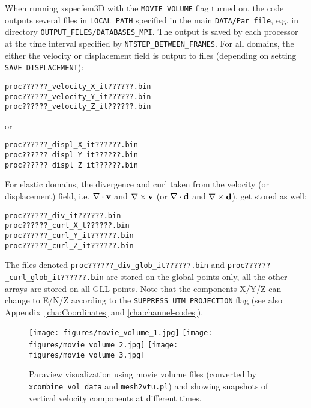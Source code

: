When running xspecfem3D with the
\texttt{\small MOVIE\_VOLUME}
flag turned on, the code outputs several files in \texttt{\small LOCAL\_PATH}
specified in the main \texttt{DATA/Par\_file},
e.g. in directory \texttt{\small OUTPUT\_FILES/DATABASES\_MPI}.
The output is saved by each processor at the time interval specified
by
\texttt{\small NTSTEP\_BETWEEN\_FRAMES}.
For all domains,
the either the velocity or displacement field is output to files (depending on setting \texttt{SAVE\_DISPLACEMENT}):
{\small
\begin{verbatim}
proc??????_velocity_X_it??????.bin
proc??????_velocity_Y_it??????.bin
proc??????_velocity_Z_it??????.bin
\end{verbatim}
}
\noindent
or
{\small
\begin{verbatim}
proc??????_displ_X_it??????.bin
proc??????_displ_Y_it??????.bin
proc??????_displ_Z_it??????.bin
\end{verbatim}
}
\noindent
For elastic domains, the divergence and curl taken from the velocity (or displacement) field,
i.e. $\nabla\cdot{\bf {v}}$ and $\nabla\times{\bf {v}}$ (or $\nabla\cdot{\bf {d}}$ and $\nabla\times{\bf {d}}$), get stored
as well:
{\small
\begin{verbatim}
proc??????_div_it??????.bin
proc??????_curl_X_t??????.bin
proc??????_curl_Y_it??????.bin
proc??????_curl_Z_it??????.bin
\end{verbatim}
}
\noindent
The files denoted \texttt{\small proc??????\_div\_glob\_it??????.bin} and
\texttt{\small proc??????\_curl\_glob\_it??????.bin}
are stored on the global points only, all the other arrays are stored
on all GLL points. Note that the components X/Y/Z can change to E/N/Z
according to the
\texttt{\small SUPPRESS\_UTM\_PROJECTION}
flag (see also Appendix~\ref{cha:Coordinates} and \ref{cha:channel-codes}).

\begin{figure}[htbp]
\begin{centering}
\texttt{[image: figures/movie\_volume\_1.jpg]}
\texttt{[image: figures/movie\_volume\_2.jpg]}
\texttt{[image: figures/movie\_volume\_3.jpg]}
\par
\end{centering}
\caption{Paraview visualization using movie volume files (converted by \texttt{xcombine\_vol\_data}
and \texttt{mesh2vtu.pl}) and showing snapshots of vertical velocity
components at different times.}
\label{fig:movie.volume}
\end{figure}


